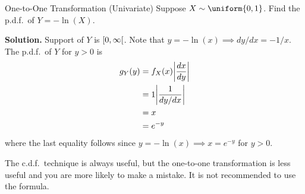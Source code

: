 \begin{Example}{One-to-One Transformation (Univariate)}{}
    Suppose $ X \sim \uniform{0,1} $. Find the p.d.f.\ of $ Y=-\ln(X) $.

    \textbf{Solution.} Support of $ Y $ is $ \interval[open right]{0}{\infty} $.
    Note that $ y=-\ln(x)\implies dy/dx=-1/x $.
    The p.d.f.\ of $ Y $ for $ y>0 $ is
    \begin{align*}
        g_Y(y)
         & =f_X(x)\abs*{\frac{dx}{dy}} \\
         & =1\abs*{\frac{1}{dy/dx}}    \\
         & =x                          \\
         & =e^{-y}
    \end{align*}
    where the last equality follows since
    $ y=-\ln(x)\implies x=e^{-y} $ for $ y>0 $.
\end{Example}
\begin{Remark}{}{}
    The c.d.f.\ technique is always useful, but the
    one-to-one transformation is less useful
    and you are more likely to make a mistake.
    It is not recommended to use the formula.
\end{Remark}
